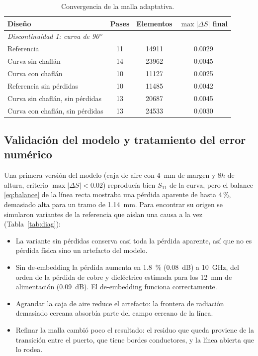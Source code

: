 \begin{table}[htbp]
\centering
\caption{Convergencia de la malla adaptativa.}
\label{tab:conv}
\footnotesize
\renewcommand{\arraystretch}{0.86}
\begin{tabular}{lccc}
\toprule
Diseño & Pases & Elementos & $\max|\Delta S|$ final \\
\midrule
\multicolumn{4}{l}{\textit{Discontinuidad 1: curva de \ang{90}}} \\
Referencia & 11 & \num{14911} & 0.0029 \\
Curva sin chaflán & 14 & \num{23962} & 0.0045 \\
Curva con chaflán & 10 & \num{11127} & 0.0025 \\
Referencia sin pérdidas & 10 & \num{11485} & 0.0042 \\
Curva sin chaflán, sin pérdidas & 13 & \num{20687} & 0.0045 \\
Curva con chaflán, sin pérdidas & 13 & \num{24533} & 0.0030 \\
\midrule
\end{tabular}
\end{table}

\subsection{Validación del modelo y tratamiento del error numérico}
\label{sec:validacion}
Una primera versión del modelo (caja de aire con \SI{4}{mm} de margen y $8h$ de altura, criterio $\max|\Delta S|<0.02$) reproducía bien $S_{11}$ de la curva, pero el balance \eqref{eq:balance} de la línea recta mostraba una pérdida aparente de hasta 4\,\%, demasiado alta para un tramo de \SI{1.14}{mm}. Para encontrar su origen se simularon variantes de la referencia que aíslan una causa a la vez (Tabla~\ref{tab:diag}):
\begin{itemize}
\item La variante sin pérdidas conserva casi toda la pérdida aparente, así que no es pérdida física sino un artefacto del modelo.
\item Sin de-embedding la pérdida aumenta en \SI{1.8}{\percent} (\SI{0.08}{dB}) a \SI{10}{GHz}, del orden de la pérdida de cobre y dieléctrico estimada para los \SI{12}{mm} de alimentación (\SI{0.09}{dB}). El de-embedding funciona correctamente.
\item Agrandar la caja de aire reduce el artefacto: la frontera de radiación demasiado cercana absorbía parte del campo cercano de la línea.
\item Refinar la malla cambió poco el resultado: el residuo que queda proviene de la transición entre el puerto, que tiene bordes conductores, y la línea abierta que lo rodea.
\end{itemize}

